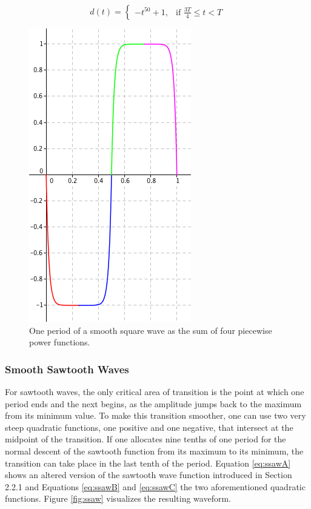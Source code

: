 \begin{equation}
  d(t) =
  \begin{cases}
    -t^{50} + 1,& \text{if } \frac{3T}{4} \leq t < T
  \end{cases}
  \label{eq:ssquareD}
\end{equation}

\begin{figure}[t!]
  \includegraphics[scale=0.6]{img/ssquare}
  \caption{One period of a smooth square wave as the sum of four piecewise power functions.}
  \label{fig:ssquare}
\end{figure}

\pagebreak

\subsubsection{Smooth Sawtooth Waves}

For sawtooth waves, the only critical area of transition is the point at which one period ends and the next begins, as the amplitude jumps back to the maximum from its minimum value. To make this transition smoother, one can use two very steep quadratic functions, one positive and one negative, that intersect at the midpoint of the transition. If one allocates nine tenths of one period for the normal descent of the sawtooth function from its maximum to its minimum, the transition can take place in the last tenth of the period. Equation \ref{eq:ssawA} shows an altered version of the sawtooth wave function introduced in Section 2.2.1 and Equations \ref{eq:ssawB} and \ref{eq:ssawC} the two aforementioned quadratic functions. Figure \ref{fig:ssaw} visualizes the resulting waveform.

